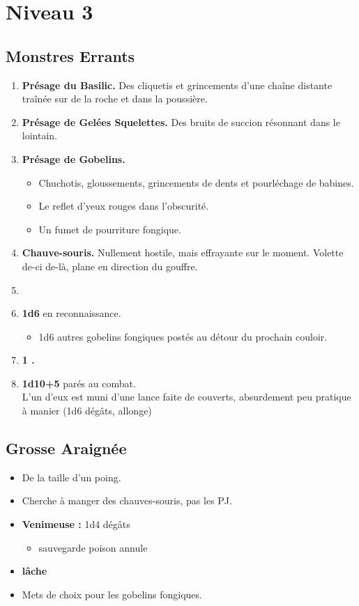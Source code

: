 \vfill
\pagebreak

\section{Niveau 3}
\subsection{Monstres Errants}\label{monster:n3:errants}
\begin{enumerate}
  \item \textbf{Présage du Basilic.}
  Des cliquetis et grincements d'une chaîne distante traînée sur de la roche et dans la poussière.
  \item \textbf{Présage de Gelées Squelettes.}
  Des bruits de succion résonnant dans le lointain.
  \item \textbf{Présage de Gobelins.}
  \begin{itemize}
    \item Chuchotis, gloussements, grincements de dents et pourléchage de babines.
    \item Le reflet d'yeux rouges dans l'obscurité.
    \item Un fumet de pourriture fongique.
  \end{itemize}
  \item \textbf{Chauve-souris.}
  Nullement hostile, mais effrayante sur le moment.
  Volette de-ci de-là, plane en direction du gouffre.
  \item \textbf{}
  \item \textbf{1d6 } en reconnaissance.
  \begin{itemize}
    \item 1d6 autres gobelins fongiques postés au détour du prochain couloir.
  \end{itemize}
  \item  \textbf{1 .}
  \item  \textbf{1d10+5 } parés au combat.\\
  L'un d'eux est muni d'une lance faite de couverts, absurdement peu pratique à manier (1d6 dégâts, allonge)
\end{enumerate}


\subsection{Grosse Araignée}\label{monster:n3:araignee}
  \begin{itemize}
  \item De la taille d'un poing.
  \item Cherche à manger des chauves-souris, pas les PJ.
  \item \textbf{Venimeuse : } 1d4 dégâts
  \begin{itemize}
    \item sauvegarde poison annule
  \end{itemize}
  \item \textbf{lâche}
  \item Mets de choix pour les gobelins fongiques.
\end{itemize}

